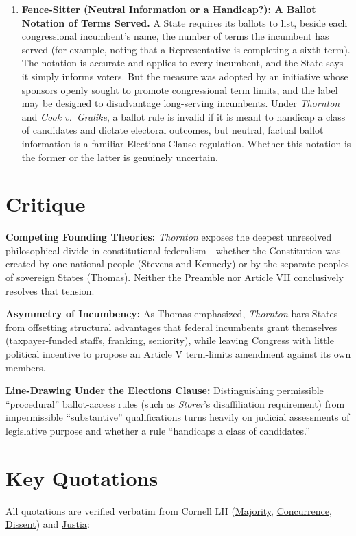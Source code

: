 \documentclass[12pt]{article}
\begin{document}
\begin{enumerate}
\item \textbf{Fence-Sitter (Neutral Information or a Handicap?): A Ballot Notation of Terms Served.} A State requires its ballots to list, beside each congressional incumbent's name, the number of terms the incumbent has served (for example, noting that a Representative is completing a sixth term). The notation is accurate and applies to every incumbent, and the State says it simply informs voters. But the measure was adopted by an initiative whose sponsors openly sought to promote congressional term limits, and the label may be designed to disadvantage long-serving incumbents. Under \textit{Thornton} and \textit{Cook v.\ Gralike}, a ballot rule is invalid if it is meant to handicap a class of candidates and dictate electoral outcomes, but neutral, factual ballot information is a familiar Elections Clause regulation. Whether this notation is the former or the latter is genuinely uncertain.

\end{enumerate}

\section{Critique}
\textbf{Competing Founding Theories:} \textit{Thornton} exposes the deepest unresolved philosophical divide in constitutional federalism---whether the Constitution was created by one national people (Stevens and Kennedy) or by the separate peoples of sovereign States (Thomas). Neither the Preamble nor Article VII conclusively resolves that tension.

\textbf{Asymmetry of Incumbency:} As Thomas emphasized, \textit{Thornton} bars States from offsetting structural advantages that federal incumbents grant themselves (taxpayer-funded staffs, franking, seniority), while leaving Congress with little political incentive to propose an Article V term-limits amendment against its own members.

\textbf{Line-Drawing Under the Elections Clause:} Distinguishing permissible ``procedural'' ballot-access rules (such as \textit{Storer}'s disaffiliation requirement) from impermissible ``substantive'' qualifications turns heavily on judicial assessments of legislative purpose and whether a rule ``handicaps a class of candidates.''

\section{Key Quotations}
All quotations are verified verbatim from Cornell LII (\href{https://www.law.cornell.edu/supct/html/93-1456.ZO.html}{Majority}, \href{https://www.law.cornell.edu/supct/html/93-1456.ZC.html}{Concurrence}, \href{https://www.law.cornell.edu/supct/html/93-1456.ZD.html}{Dissent}) and \href{https://supreme.justia.com/cases/federal/us/514/779/}{Justia}:
\end{document}
